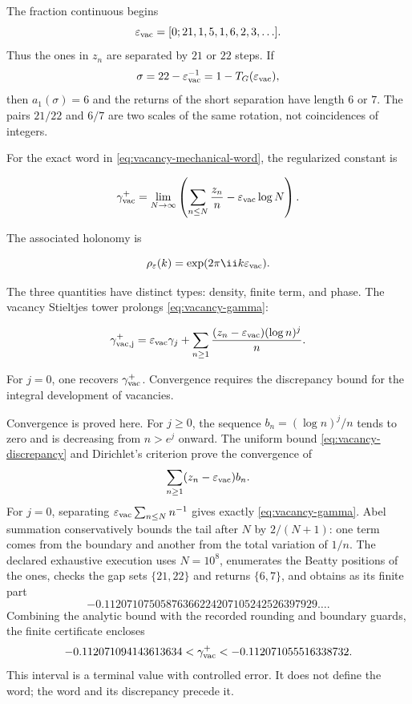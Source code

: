 The fraction continuous begins
\[
\varepsilon_{\rm vac}
=[0;21,1,5,1,6,2,3,\ldots].
\]
Thus the ones in \(z_n\) are separated by \(21\) or \(22\) steps.
If
\[
\sigma=22-\varepsilon_{\rm vac}^{-1}
=1-T_G(\varepsilon_{\rm vac}),
\]
then \(a_1(\sigma)=6\) and the returns of the short separation have
length \(6\) or \(7\). The pairs \(21/22\) and \(6/7\) are two scales of
the same rotation, not coincidences of integers.

For the exact word in \cref{eq:vacancy-mechanical-word}, the regularized constant is

\begin{equation}
\gamma_{\rm vac}^{+}
=\lim_{N\to\infty}\left(
\sum_{n\le N}\frac{z_n}{n}
-\varepsilon_{\rm vac}\log N
\right).
\label{eq:vacancy-gamma}
\end{equation}

The associated holonomy is

\begin{equation}
\rho_\varepsilon(k)=\exp(2\pi\ii k\varepsilon_{\rm vac}).
\label{eq:vacancy-holonomy}
\end{equation}

The three quantities have distinct types: density, finite term, and phase. The vacancy Stieltjes tower prolongs \cref{eq:vacancy-gamma}:

\begin{equation}
\gamma_{\rm vac,j}^{+}
=\varepsilon_{\rm vac}\gamma_j
+\sum_{n\ge1}\frac{(z_n-\varepsilon_{\rm vac})(\log n)^j}{n}.
\label{eq:vacancy-stieltjes}
\end{equation}

For \(j=0\), one recovers \(\gamma_{\rm vac}^{+}\). Convergence requires the
discrepancy bound for the integral development of vacancies.

Convergence is proved here. For \(j\ge0\), the sequence
\(b_n=(\log n)^j/n\) tends to zero and is decreasing from
\(n>e^j\) onward. The uniform bound \cref{eq:vacancy-discrepancy} and Dirichlet's criterion prove the convergence of
\[
\sum_{n\ge1}(z_n-\varepsilon_{\rm vac})b_n.
\]
For \(j=0\), separating
\(\varepsilon_{\rm vac}\sum_{n\le N}n^{-1}\) gives exactly
\cref{eq:vacancy-gamma}. Abel summation conservatively bounds the
tail after \(N\) by \(2/(N+1)\): one term comes from the boundary and
another from the total variation of \(1/n\). The declared exhaustive execution uses
\(N=10^8\), enumerates the Beatty positions of the ones, checks the
gap sets \(\{21,22\}\) and returns \(\{6,7\}\), and obtains as its
finite part
\[
-0.11207107505876366224207105242526397929\ldots.
\]
Combining the analytic bound with the recorded rounding and boundary
guards, the finite certificate encloses
\begin{equation}
-0.112071094143613634
<\gamma_{\rm vac}^{+}
<-0.112071055516338732.
\label{eq:vacancy-gamma-interval}
\end{equation}
This interval is a terminal value with controlled error. It does not define the
word; the word and its discrepancy precede it.

